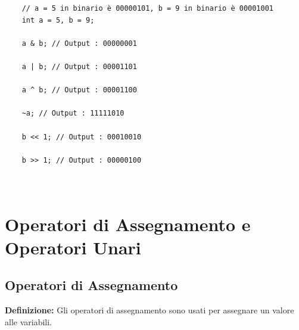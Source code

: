 \begin{lstlisting}
	// a = 5 in binario è 00000101, b = 9 in binario è 00001001
	int a = 5, b = 9;
	
	a & b; // Output : 00000001
	
	a | b; // Output : 00001101
	
	a ^ b; // Output : 00001100
	
	~a; // Output : 11111010
	
	b << 1; // Output : 00010010
	
	b >> 1; // Output : 00000100
	
	
\end{lstlisting}


\section{Operatori di Assegnamento e Operatori Unari}

\subsection{Operatori di Assegnamento}

\textsf{\small \textbf{Definizione: } Gli operatori di assegnamento sono usati per assegnare un valore alle variabili.} \\

